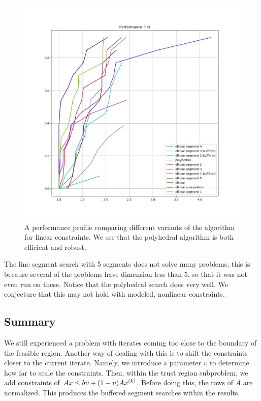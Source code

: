\begin{figure}[ht]
    \centering
    \includegraphics[scale=0.4]{images/performance_profile_plot.png}
    \caption[A performance profile comparing different variants of the algorithm for linear constraints.]{
    	A performance profile comparing different variants of the algorithm for linear constraints.
    	We see that the polyhedral algorithm is both efficient and robust.
    }
    \label{performance_profile_image}
\end{figure}



The line segment search with 5 segments does not solve many problems, this is because several of the problems have dimension less than $5$, so that it was not even run on these.
Notice that the polyhedral search does very well.
We conjecture that this may not hold with modeled, nonlinear constraints.


\subsection{Summary}
We still experienced a problem with iterates coming too close to the boundary of the feasible region.
Another way of dealing with this is to shift the constraints closer to the current iterate.
Namely, we introduce a parameter $\upsilon$ to determine how far to scale the constraints.
Then, within the trust region subproblem, we add constraints of $Ax \le b\upsilon + (1-\upsilon) A x^{(k)} $.
Before doing this, the rows of $A$ are normalized.
This produces the buffered segment searches within the results.

